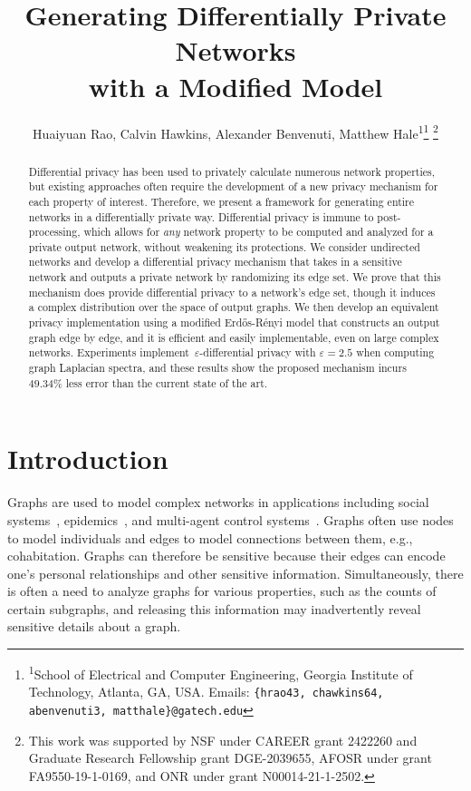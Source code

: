 \documentclass[conference]{ieeeconf}
\title{Generating Differentially Private Networks \\ with a Modified
\ER Model}
\author{Huaiyuan Rao, Calvin Hawkins, Alexander Benvenuti, Matthew Hale\textsuperscript{1}\thanks{\textsuperscript{1}School of Electrical and Computer Engineering, Georgia Institute of Technology, Atlanta, GA, USA.
Emails: {\texttt{\{hrao43, chawkins64, abenvenuti3, matthale\}@gatech.edu}}}
\thanks{
This work was supported by 
NSF under CAREER grant 2422260 and Graduate Research Fellowship grant DGE-2039655,
AFOSR under grant FA9550-19-1-0169, and
ONR under grant N00014-21-1-2502.}}
\begin{document}
\maketitle
\begin{abstract}
    Differential privacy has been used to privately calculate numerous network properties,
    but existing approaches often require the development of a new privacy mechanism 
    for each property of interest. 
    Therefore, we present a framework for generating entire networks in a differentially private way. 
    Differential privacy is immune to post-processing, which allows for \emph{any} 
    network property to be computed and analyzed for a private output network, 
    without weakening its protections. 
    We consider undirected networks and develop a differential privacy
    mechanism that takes in a sensitive network and outputs a private network by randomizing its edge set.    
    We prove that this mechanism does provide differential privacy to a network's edge set, 
    though it induces a complex distribution over the space of output graphs.     
    We then develop an equivalent 
    privacy implementation using a modified Erd\H{o}s-R{\'e}nyi model
     that 
    constructs an output graph edge by edge, and it
    is efficient and easily implementable, 
    even on large complex networks. 
    Experiments implement~$\varepsilon$-differential privacy with $\varepsilon=2.5$ when computing graph Laplacian spectra, and these results show the proposed mechanism incurs $49.34\%$ less error than the current state of the art.  
\end{abstract}


\section{Introduction}
Graphs are used to model complex networks in applications including social systems~\cite{aggarwal2011introduction, tabassum2018social}, epidemics~\cite{pare2020modeling, chen2025scalable}, and multi-agent control systems~\cite{shi2020survey, qin2016recent}.
Graphs often use nodes to model individuals and edges to model connections
between them, e.g., cohabitation. 
Graphs can therefore be sensitive 
because their edges can encode one's personal relationships and other sensitive information. 
Simultaneously, there is often a need to analyze graphs for various properties,
such as the counts of certain subgraphs, and releasing this information may inadvertently
reveal sensitive details about a graph.
\end{document}
